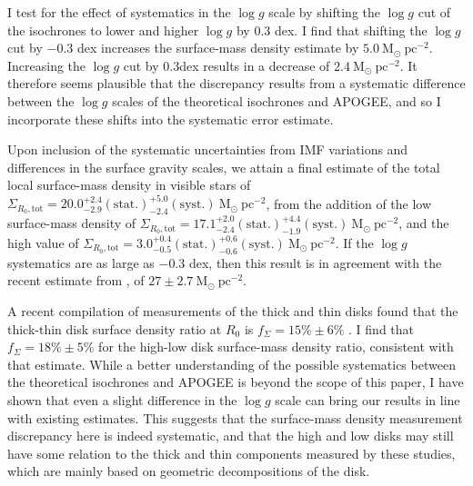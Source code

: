 I test for the effect of systematics in the $\log{g}$ scale by shifting the $\log{g}$ cut of the isochrones to lower and higher $\log{g}$ by $0.3$ dex. I find that shifting the $\log{g}$ cut by $-0.3$ dex increases the surface-mass density estimate by $5.0\ \mathrm{M_{\odot}\ pc^{-2}}$. Increasing the $\log{g}$ cut by $0.3$dex results in a decrease of $ 2.4\ \mathrm{M_{\odot}\ pc^{-2}}$. It therefore seems plausible that the discrepancy results from a systematic difference between the $\log{g}$ scales of the theoretical isochrones and APOGEE, and so I incorporate these shifts into the systematic error estimate. 

Upon inclusion of the systematic uncertainties from IMF variations and differences in the surface gravity scales, we attain a final estimate of the total local surface-mass density in visible stars of $\Sigma_{R_0, \text{tot}} = 20.0_{-2.9}^{+2.4}\mathrm{(stat.)}_{-2.4}^{+5.0}\mathrm{(syst.)}\ \mathrm{M_{\odot} \ pc^{-2}}$, from the addition of the low \afe{} surface-mass density of $\Sigma_{R_0, \text{tot}} = 17.1_{-2.4}^{+2.0}\mathrm{(stat.)}_{-1.9}^{+4.4}\mathrm{(syst.)}\ \mathrm{M_{\odot} \ pc^{-2}}$, and the high \afe{} value of $\Sigma_{R_0, \text{tot}} = 3.0_{-0.5}^{+0.4}\mathrm{(stat.)}_{-0.6}^{+0.6}\mathrm{(syst.)}\ \mathrm{M_{\odot} \ pc^{-2}}$.  If the $\log{g}$ systematics are as large as $-0.3$ dex, then this result is in agreement with the recent estimate from \citet{2015ApJ...814...13M}, of $27\pm 2.7\ \mathrm{M_{\odot} \ pc^{-2}}$.

A recent compilation of measurements of the thick and thin disks found that the thick-thin disk surface density ratio at $R_0$ is $f_{\Sigma} = 15\% \pm 6\%$ \citep{2016ARA&A..54..529B}. I find that $f_{\Sigma} = 18\% \pm 5\%$ for the high-low \afe{} disk surface-mass density ratio, consistent with that estimate. While a better understanding of the possible systematics between the theoretical isochrones and APOGEE is beyond the scope of this paper, I have shown that even a slight difference in the $\log{g}$ scale can bring our results in line with existing estimates. This suggests that the surface-mass density measurement discrepancy here is indeed systematic, and that the high and low \afe{} disks may still have some relation to the thick and thin components measured by these studies, which are mainly based on geometric decompositions of the disk. 

